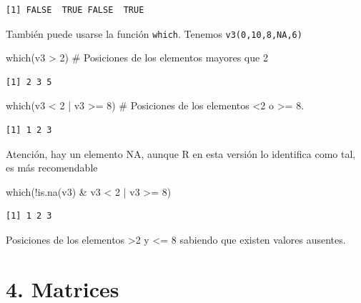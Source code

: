 \documentclass[
  letterpaper,
]{scrbook}
\newenvironment{Shaded}{\begin{snugshade}}{\end{snugshade}}
\newcommand{\CommentTok}[1]{\textcolor[rgb]{0.37,0.37,0.37}{#1}}
\newcommand{\DecValTok}[1]{\textcolor[rgb]{0.68,0.00,0.00}{#1}}
\newcommand{\FunctionTok}[1]{\textcolor[rgb]{0.28,0.35,0.67}{#1}}
\newcommand{\NormalTok}[1]{\textcolor[rgb]{0.00,0.23,0.31}{#1}}
\newcommand{\SpecialCharTok}[1]{\textcolor[rgb]{0.37,0.37,0.37}{#1}}
\begin{document}
\begin{verbatim}
[1] FALSE  TRUE FALSE  TRUE
\end{verbatim}

También puede usarse la función \texttt{which}. Tenemos
\texttt{v3(0,10,8,NA,6)}

\begin{Shaded}
\begin{Highlighting}[]
\FunctionTok{which}\NormalTok{(v3 }\SpecialCharTok{\textgreater{}} \DecValTok{2}\NormalTok{) }\CommentTok{\# Posiciones de los elementos mayores que 2}
\end{Highlighting}
\end{Shaded}

\begin{verbatim}
[1] 2 3 5
\end{verbatim}

\begin{Shaded}
\begin{Highlighting}[]
\FunctionTok{which}\NormalTok{(v3 }\SpecialCharTok{\textless{}} \DecValTok{2} \SpecialCharTok{|}\NormalTok{ v3 }\SpecialCharTok{\textgreater{}=} \DecValTok{8}\NormalTok{) }\CommentTok{\# Posiciones de los elementos \textless{}2 o \textgreater{}= 8.  }
\end{Highlighting}
\end{Shaded}

\begin{verbatim}
[1] 1 2 3
\end{verbatim}

Atención, hay un elemento NA, aunque R en esta versión lo identifica
como tal, es más recomendable

\begin{Shaded}
\begin{Highlighting}[]
\FunctionTok{which}\NormalTok{(}\SpecialCharTok{!}\FunctionTok{is.na}\NormalTok{(v3) }\SpecialCharTok{\&}\NormalTok{ v3 }\SpecialCharTok{\textless{}} \DecValTok{2} \SpecialCharTok{|}\NormalTok{ v3 }\SpecialCharTok{\textgreater{}=} \DecValTok{8}\NormalTok{) }
\end{Highlighting}
\end{Shaded}

\begin{verbatim}
[1] 1 2 3
\end{verbatim}

Posiciones de los elementos \textgreater2 y \textless= 8 sabiendo que
existen valores ausentes.

\hypertarget{matrices}{%
\section{4. Matrices}\label{matrices}}
\end{document}
